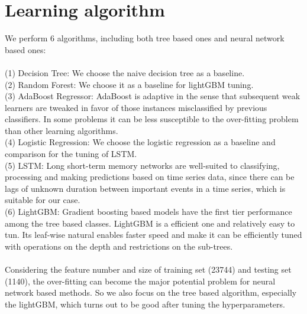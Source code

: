 \documentclass{article}
\begin{document}
\section{Learning algorithm}
We perform 6 algorithms, including both tree based ones and neural network based ones:\\\\
(1) Decision Tree:  We choose the naive decision tree as a baseline.\\
(2) Random Forest:  We choose it as a baseline for lightGBM tuning.\\
(3) AdaBoost Regressor:  AdaBoost is adaptive in the sense that subsequent weak learners are tweaked in favor of those instances misclassified by previous classifiers. In some problems it can be less susceptible to the over-fitting problem than other learning algorithms.\\
(4) Logistic Regression:  We choose the logistic regression as a baseline and comparison for the tuning of LSTM.\\
(5) LSTM:  Long short-term memory networks are well-suited to classifying, processing and making predictions based on time series data, since there can be lags of unknown duration between important events in a time series, which is suitable for our case.\\
(6) LightGBM:  Gradient boosting based models have the first tier performance among the tree based classes. LightGBM is a efficient one and relatively easy to tun. Its leaf-wise natural enables faster speed and make it can be efficiently tuned with operations on the depth and restrictions on the sub-trees.\\\\
Considering the feature number and size of training set (23744) and testing set (1140), the over-fitting can become the major potential problem for neural network based methods. So we also focus on the tree based algorithm, especially the lightGBM, which turns out to be good after tuning the hyperparameters.
\end{document}
